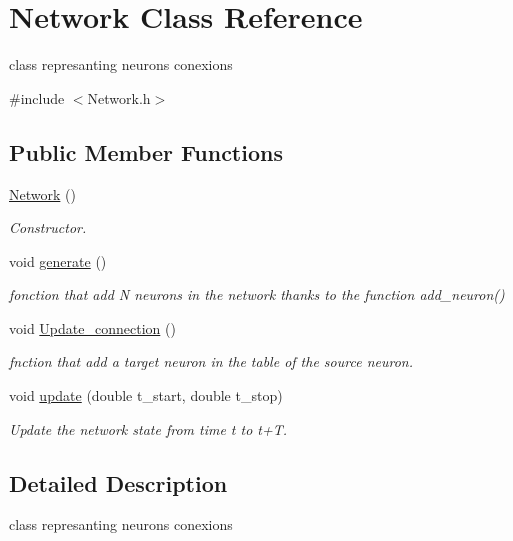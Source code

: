 \hypertarget{classNetwork}{\section{Network Class Reference}
\label{classNetwork}
}


class represanting neurons conexions  




{\ttfamily \#include $<$Network.\-h$>$}

\subsection*{Public Member Functions}
\begin{DoxyCompactItemize}
\item 
\hyperlink{classNetwork_a3cc2fb4f8fa4d507077e8da85ce5a1c8}{Network} ()
\begin{DoxyCompactList}\small\item\em Constructor. \end{DoxyCompactList}\item 
\hypertarget{classNetwork_ada5ad9d86ab3d81803140410e22d82af}{void \hyperlink{classNetwork_ada5ad9d86ab3d81803140410e22d82af}{generate} ()}\label{classNetwork_ada5ad9d86ab3d81803140410e22d82af}

\begin{DoxyCompactList}\small\item\em fonction that add N neurons in the network thanks to the function add\-\_\-neuron() \end{DoxyCompactList}\item 
void \hyperlink{classNetwork_a6291ac92355a8790b74dc7b327439e6f}{Update\-\_\-connection} ()
\begin{DoxyCompactList}\small\item\em fnction that add a target neuron in the table of the source neuron. \end{DoxyCompactList}\item 
void \hyperlink{classNetwork_a34225847b28e9acd8132c591a9dbd7c4}{update} (double t\-\_\-start, double t\-\_\-stop)
\begin{DoxyCompactList}\small\item\em Update the network state from time t to t+\-T. \end{DoxyCompactList}\end{DoxyCompactItemize}


\subsection{Detailed Description}
class represanting neurons conexions 

